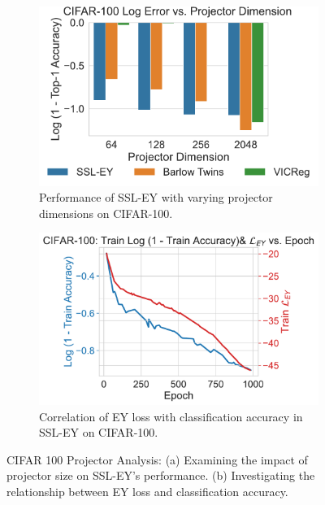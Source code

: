 \begin{figure}[H]
    \begin{subfigure}[b]{0.47\textwidth}
        \centering
        \includegraphics[width=\textwidth]{figures/SSL/cifar100_proj_dim_log_error}
        \caption{Performance of SSL-EY with varying projector dimensions on CIFAR-100.}
        \label{fig:ssl_projector_dimensions_100}
    \end{subfigure}
    \hfill
    \begin{subfigure}[b]{0.47\textwidth}
        \centering
        \includegraphics[width=\textwidth]{figures/SSL/cifar100_corr_vs_acc_log_error}
        \caption{Correlation of EY loss with classification accuracy in SSL-EY on CIFAR-100.}
        \label{fig:ssl_learning_curve_cifar100_vs_corr}
    \end{subfigure}
    \caption{CIFAR 100 Projector Analysis: (a) Examining the impact of projector size on SSL-EY's performance. (b) Investigating the relationship between EY loss and classification accuracy.}
    \label{fig:ssl_projector_cifar_100}
\end{figure}

